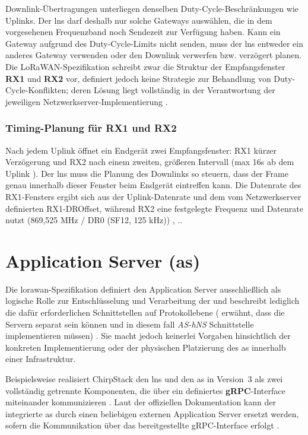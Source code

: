 Downlink-Übertragungen unterliegen denselben Duty-Cycle-Beschränkungen wie Uplinks. Der \ac{lns} darf deshalb nur solche Gateways auswählen, die in dem vorgesehenen Frequenzband noch Sendezeit zur Verfügung haben. Kann ein Gateway aufgrund des Duty-Cycle-Limits nicht senden, muss der \ac{lns} entweder ein anderes Gateway verwenden oder den Downlink verwerfen bzw. verzögert planen. Die LoRaWAN-Spezifikation schreibt zwar die Struktur der Empfangsfenster \textbf{RX1} und \textbf{RX2} vor, definiert jedoch keine Strategie zur Behandlung von Duty-Cycle-Konflikten; deren Lösung liegt vollständig in der Verantwortung der jeweiligen Netzwerkserver-Implementierung \cite{ETSI:2018b}.

\subsubsection{Timing-Planung für RX1 und RX2}

Nach jedem Uplink öffnet ein Endgerät zwei Empfangsfenster: RX1 kürzer Verzögerung und RX2 nach einem zweiten, grö{\ss}eren Intervall (max 16s ab dem Uplink \cite{LoRaAlliance:2020b}). Der \ac{lns} muss die Planung des Downlinks so steuern, dass der Frame genau innerhalb dieser Fenster beim Endgerät eintreffen kann. Die Datenrate des RX1-Fensters ergibt sich aus der Uplink-Datenrate und dem vom Netzwerkserver definierten RX1-DROffset, während RX2 eine festgelegte Frequenz und Datenrate nutzt (869{,}525 MHz / DR0 (SF12, 125 kHz)) \cite{Semtech:2024}, \cite[13]{LoRaAlliance:2020b}..

\section{Application Server (\acs{as}) \label{server:appserver}}

Die \ac{lorawan}-Spezifikation definiert den Application Server ausschlie{\ss}lich als logische Rolle zur Entschlüsselung und Verarbeitung der  und beschreibt lediglich die dafür erforderlichen Schnittstellen auf Protokollebene (\textcite{LoRaAlliance:2020c} erwähnt, dass die Servern separat sein können und in diesem fall \textit{AS-hNS} Schnittstelle implementieren müssen) \cite{LoRaAlliance:2020c}. Sie macht jedoch keinerlei Vorgaben hinsichtlich der konkreten Implementierung oder der physischen Platzierung des \ac{as} innerhalb einer Infrastruktur. 

Beispielsweise realisiert ChirpStack den \ac{lns} und den \ac{as} in Version~3 als zwei vollständig getrennte Komponenten, die über ein definiertes \textbf{gRPC}-Interface miteinander kommunizieren \cite{ChirpStack:2020}. Laut der offiziellen Dokumentation kann der integrierte \ac{as} durch einen beliebigen externen Application Server ersetzt werden, sofern die Kommunikation über das bereitgestellte gRPC-Interface erfolgt \cite{ChirpStack:2022}. 
	
